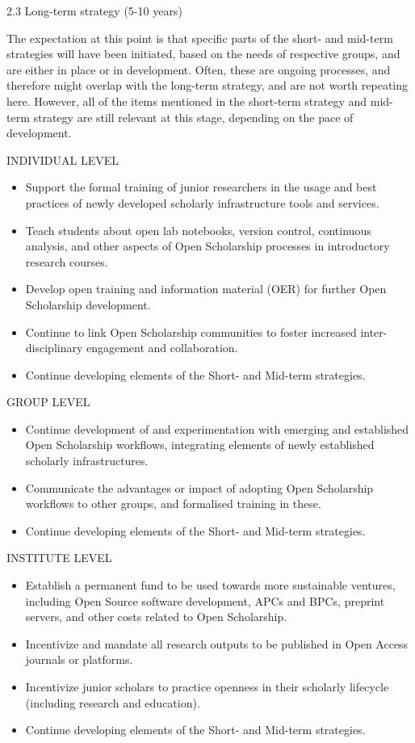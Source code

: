 \documentclass[]{article}
\begin{document}
2.3 Long-term strategy (5-10 years)

The expectation at this point is that specific parts of the short- and
mid-term strategies will have been initiated, based on the needs of
respective groups, and are either in place or in development. Often,
these are ongoing processes, and therefore might overlap with the
long-term strategy, and are not worth repeating here. However, all of
the items mentioned in the short-term strategy and mid-term strategy are
still relevant at this stage, depending on the pace of development.

INDIVIDUAL LEVEL

\begin{itemize}
\item
  Support the formal training of junior researchers in the usage and
  best practices of newly developed scholarly infrastructure tools and
  services.
\item
  Teach students about open lab notebooks, version control, continuous
  analysis, and other aspects of Open Scholarship processes in
  introductory research courses.
\item
  Develop open training and information material (OER) for further Open
  Scholarship development.
\item
  Continue to link Open Scholarship communities to foster increased
  inter-disciplinary engagement and collaboration.
\item
  Continue developing elements of the Short- and Mid-term strategies.
\end{itemize}

GROUP LEVEL

\begin{itemize}
\item
  Continue development of and experimentation with emerging and
  established Open Scholarship workflows, integrating elements of newly
  established scholarly infrastructures.
\item
  Communicate the advantages or impact of adopting Open Scholarship
  workflows to other groups, and formalised training in these.
\item
  Continue developing elements of the Short- and Mid-term strategies.
\end{itemize}

INSTITUTE LEVEL

\begin{itemize}
\item
  Establish a permanent fund to be used towards more sustainable
  ventures, including Open Source software development, APCs and BPCs,
  preprint servers, and other costs related to Open Scholarship.
\item
  Incentivize and mandate all research outputs to be published in Open
  Access journals or platforms.
\item
  Incentivize junior scholars to practice openness in their scholarly
  lifecycle (including research and education).
\item
  Continue developing elements of the Short- and Mid-term strategies.
\end{itemize}
\end{document}
